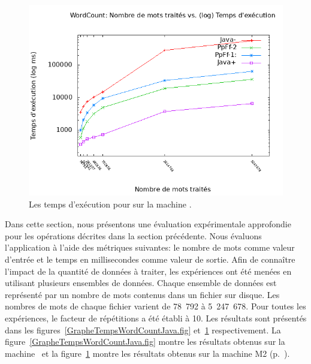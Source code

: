 \begin{figure}[H]
\centering
     \includegraphics[width=1.0\textwidth]{Figures/graphe_temps_Japet_WordCount.png}
      \caption{Les temps d'ex\'ecution pour  sur la machine .}
       \label{GrapheTempsWordCountJapet.fig}
\end{figure}


Dans cette section, nous présentons une \'evaluation exp\'erimentale approfondie pour les op\'erations d\'ecrites dans la section pr\'ec\'edente. Nous \'evaluons l'application  \`a l'aide des m\'etriques suivantes: le nombre de mots comme valeur d'entr\'ee et le temps en millisecondes comme valeur de sortie. Afin de conna\^itre l'impact de la quantit\'e de donn\'ees \`a traiter, les exp\'eriences ont \'et\'e men\'ees en utilisant plusieurs ensembles de donn\'ees. Chaque ensemble de donn\'ees est repr\'esent\'e par un nombre de mots contenus dans un fichier sur disque. Les nombres de mots de chaque fichier varient de 78~792 \`a 5~247~678. Pour toutes les exp\'eriences, le facteur de r\'ep\'etitions a \'et\'e \'etabli \`a 10.  Les r\'esultats sont pr\'esent\'es dans les figures~\ref{GrapheTempsWordCountJava.fig} et~\ref{GrapheTempsWordCountJapet.fig} respectivement. La figure~\ref{GrapheTempsWordCountJava.fig} montre les résultats obtenus sur la machine \ et la figure~\ref{GrapheTempsWordCountJapet.fig} montre les r\'esultats obtenus sur la machine M2 (p.~\pageref{machines.sect}).

